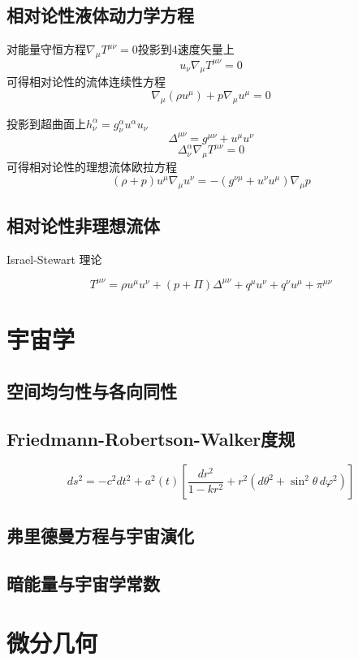 \documentclass[a4paper]{report}
\begin{document}
\section{相对论性液体动力学方程}
对能量守恒方程$\nabla_\mu T^{\mu\nu}=0$投影到4速度矢量上
\begin{equation}
    u_\nu \nabla_\mu T^{\mu\nu}=0
\end{equation}
可得相对论性的流体连续性方程
\begin{equation}
    \nabla_\mu (\rho u^\mu) + p \nabla_\mu u^\mu =0
\end{equation}

投影到超曲面上$h^\alpha_\nu = g^\alpha_\nu u^\alpha u_\nu$
\begin{equation}
    \Delta^{\mu\nu} = g^{\mu\nu}+u^\mu u^\nu
\end{equation}
\begin{equation}
    \Delta^\alpha_\nu \nabla_\mu T^{\mu\nu}=0
\end{equation}
可得相对论性的理想流体欧拉方程
\begin{equation}
    (\rho + p)u^\mu \nabla_\mu u^\nu = -(g^{\nu\mu}+u^\nu u^\mu)\nabla_\mu p
\end{equation}


\section{相对论性非理想流体}

Israel-Stewart 理论

\begin{equation}
    T^{\mu\nu}=\rho u^\mu u^\nu + (p+\Pi)\Delta ^{\mu\nu} + q^\mu u^\nu + q^\nu u^\mu + \pi^{\mu\nu}
\end{equation}



\chapter{宇宙学}
\section{空间均匀性与各向同性}
\section{Friedmann-Robertson-Walker度规}
\begin{equation}
    ds^2 = -c^2 dt^2 + a^2(t) \left[ \frac{dr^2}{1 - k r^2} + r^2 (d\theta^2 + \sin^2\theta\, d\varphi^2) \right] 
\end{equation}
\section{弗里德曼方程与宇宙演化}
\section{暗能量与宇宙学常数}




\appendix
\chapter{微分几何}
\end{document}
